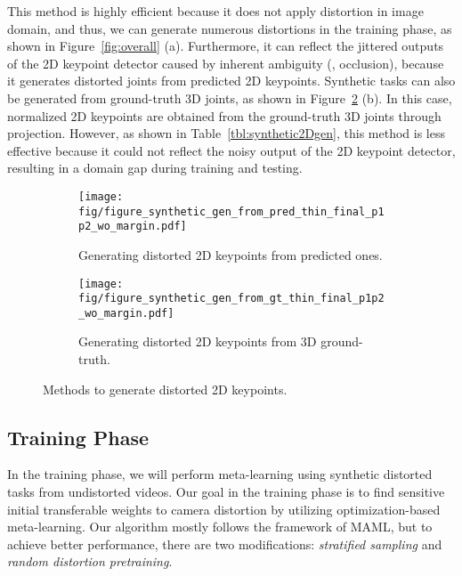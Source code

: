         This method is highly efficient because it does not apply distortion in image domain, and thus, we can generate numerous distortions in the training phase, as shown in Figure~\ref{fig:overall} (a). Furthermore, it can reflect the jittered outputs of the 2D keypoint detector caused by inherent ambiguity (\eg, occlusion), because it generates distorted joints from predicted 2D keypoints. Synthetic tasks can also be generated from ground-truth 3D joints, as shown in Figure~\ref{fig:synthetic data} (b). In this case, normalized 2D keypoints are obtained from the ground-truth 3D joints through projection. However, as shown in Table~\ref{tbl:synthetic2Dgen}, this method is less effective because it could not reflect the noisy output of the 2D keypoint detector, resulting in a domain gap during training and testing.
        
        \begin{figure}[t]
        	\begin{center}
        		\captionsetup{justification=centering}
        		\begin{subfigure}[t]{1.0\linewidth}
        			\centering
        			\texttt{[image: fig/figure\_synthetic\_gen\_from\_pred\_thin\_final\_p1p2\_wo\_margin.pdf]}
        			\caption{Generating distorted 2D keypoints from predicted ones.}
        		\end{subfigure}
        		\begin{subfigure}[t]{1\linewidth}
        			\centering
        			\texttt{[image: fig/figure\_synthetic\_gen\_from\_gt\_thin\_final\_p1p2\_wo\_margin.pdf]}
        			\caption{Generating distorted 2D keypoints from 3D ground-truth.}
        			\label{subfig:b}
        		\end{subfigure}
        	\end{center}
        	    \vspace{-5mm}
        		\caption{Methods to generate distorted 2D keypoints.}
        	    \vspace{-4mm}
        	\label{fig:synthetic data}
        \end{figure}

    \subsection{Training Phase}
        \label{sec:Training Phase}
        In the training phase, we will perform meta-learning using synthetic distorted tasks from undistorted videos. Our goal in the training phase is to find sensitive initial transferable weights to camera distortion by utilizing optimization-based meta-learning. Our algorithm mostly follows the framework of MAML, but to achieve better performance, there are two modifications: \textit{stratified sampling} and \textit{random distortion pretraining}.
    
